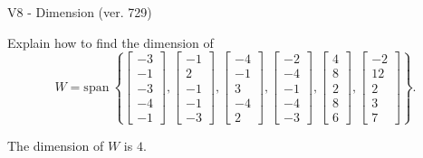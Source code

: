 \begin{exercise}
  \begin{exerciseTitle}V8 - Dimension (ver. 729)\end{exerciseTitle}
  \begin{exerciseStatement}
    Explain how to find the dimension of 
\[W=\mathrm{span}\ \left\{\left[\begin{array}{r}
-3 \\
-1 \\
-3 \\
-4 \\
-1
\end{array}\right] , \left[\begin{array}{r}
-1 \\
2 \\
-1 \\
-1 \\
-3
\end{array}\right] , \left[\begin{array}{r}
-4 \\
-1 \\
3 \\
-4 \\
2
\end{array}\right] , \left[\begin{array}{r}
-2 \\
-4 \\
-1 \\
-4 \\
-3
\end{array}\right] , \left[\begin{array}{r}
4 \\
8 \\
2 \\
8 \\
6
\end{array}\right] , \left[\begin{array}{r}
-2 \\
12 \\
2 \\
3 \\
7
\end{array}\right]\right\}.\]



  \end{exerciseStatement}
  \begin{exerciseAnswer}
   The dimension of \(W\) is  \(4\).
  


  \end{exerciseAnswer}
\end{exercise}